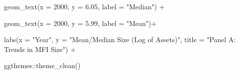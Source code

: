 \documentclass[a4paper,nobind]{templates/ociamthesis}
\newenvironment{Shaded}{\begin{snugshade}}{\end{snugshade}}
\newcommand{\AttributeTok}[1]{\textcolor[rgb]{0.77,0.63,0.00}{#1}}
\newcommand{\DecValTok}[1]{\textcolor[rgb]{0.00,0.00,0.81}{#1}}
\newcommand{\FloatTok}[1]{\textcolor[rgb]{0.00,0.00,0.81}{#1}}
\newcommand{\FunctionTok}[1]{\textcolor[rgb]{0.00,0.00,0.00}{#1}}
\newcommand{\NormalTok}[1]{#1}
\newcommand{\SpecialCharTok}[1]{\textcolor[rgb]{0.00,0.00,0.00}{#1}}
\newcommand{\StringTok}[1]{\textcolor[rgb]{0.31,0.60,0.02}{#1}}
\renewenvironment{Shaded}
{
  \vspace{10pt}%
  \begin{snugshade}%
}{%
  \end{snugshade}%
  \vspace{8pt}%
}
\begin{document}
\begin{Shaded}
\begin{Highlighting}[]
  \FunctionTok{geom\_text}\NormalTok{(}\AttributeTok{x =} \DecValTok{2000}\NormalTok{, }\AttributeTok{y =} \FloatTok{6.05}\NormalTok{, }\AttributeTok{label =} \StringTok{"Median"}\NormalTok{) }\SpecialCharTok{+} 
  
  \FunctionTok{geom\_text}\NormalTok{(}\AttributeTok{x =} \DecValTok{2000}\NormalTok{, }\AttributeTok{y =} \FloatTok{5.99}\NormalTok{, }\AttributeTok{label =} \StringTok{"Mean"}\NormalTok{)}\SpecialCharTok{+}
  
  \FunctionTok{labs}\NormalTok{(}\AttributeTok{x =} \StringTok{"Year"}\NormalTok{, }\AttributeTok{y =} \StringTok{"Mean/Median Size (Log of Assets)"}\NormalTok{, }\AttributeTok{title =} \StringTok{"Panel A: Trends in MFI Size"}\NormalTok{) }\SpecialCharTok{+} 
  
\NormalTok{  ggthemes}\SpecialCharTok{::}\FunctionTok{theme\_clean}\NormalTok{()}
\end{Highlighting}
\end{Shaded}
\end{document}
